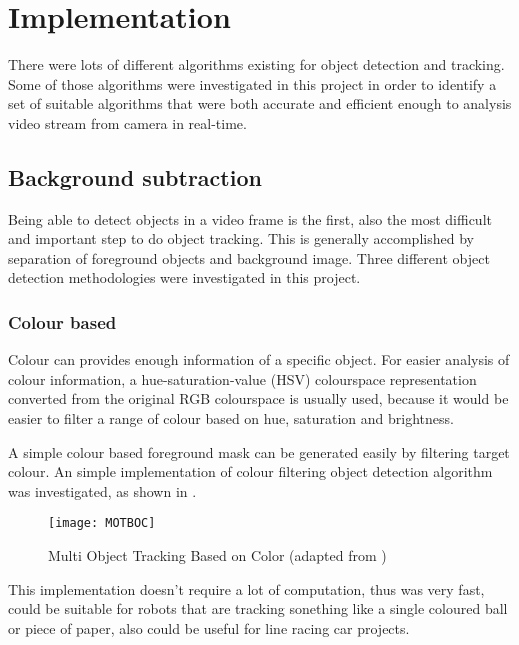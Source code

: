 \chapter{Implementation}

There were lots of different algorithms existing for object detection and tracking. Some of those algorithms were investigated in this project in order to identify a set of suitable algorithms that were both accurate and efficient enough to analysis video stream from camera in real-time.

\section{Background subtraction}

Being able to detect objects in a video frame is the first, also the most difficult and important step to do object tracking. This is generally accomplished by separation of foreground objects and background image. Three different object detection methodologies were investigated in this project.

\subsection{Colour based}

Colour can provides enough information of a specific object. For easier analysis of colour information, a hue-saturation-value (HSV) colourspace \cite[p.~301]{colourspace} representation converted from the original RGB colourspace is usually used, because it would be easier to filter a range of colour based on hue, saturation and brightness.

A simple colour based foreground mask can be generated easily by filtering target colour. An simple implementation \cite{MOTBOC.git} of colour filtering object detection algorithm was investigated, as shown in .

\begin{figure}[H]
  \centering
  \texttt{[image: MOTBOC]}
  \caption{Multi Object Tracking Based on Color (adapted from \cite{MOTBOC.git})}
  \label{Figure:MOTBOC}
\end{figure}

This implementation doesn't require a lot of computation, thus was very fast, could be suitable for robots that are tracking sonething like a single coloured ball or piece of paper, also could be useful for line racing car projects.

